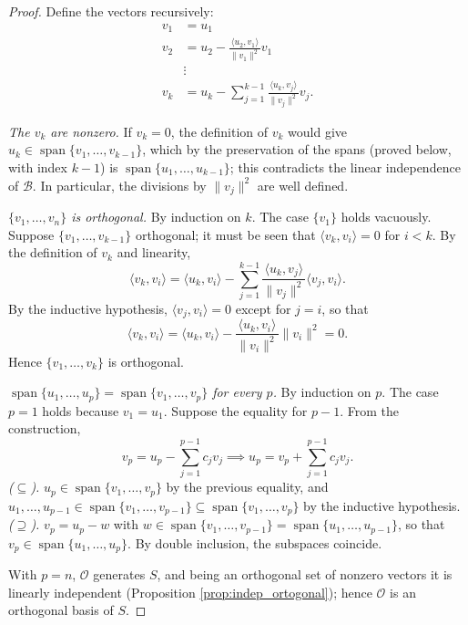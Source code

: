 \documentclass[11pt, a4paper]{article}
\begin{document}
\begin{proof}
Define the vectors recursively:
\begin{align*}
v_1 &= u_1 \\
v_2 &= u_2 - \frac{\langle u_2, v_1 \rangle}{\|v_1\|^2} v_1 \\
&\vdots \\
v_k &= u_k - \sum_{j=1}^{k-1} \frac{\langle u_k, v_j \rangle}{\|v_j\|^2} v_j.
\end{align*}

\textit{The $v_k$ are nonzero.} If $v_k = 0$, the definition of $v_k$ would give
$u_k \in \operatorname{span}\{v_1, \dots, v_{k-1}\}$, which by the preservation of the spans
(proved below, with index $k-1$) is $\operatorname{span}\{u_1, \dots, u_{k-1}\}$; this
contradicts the linear independence of $\mathcal{B}$. In particular, the divisions by
$\|v_j\|^2$ are well defined.

\textit{$\{v_1, \dots, v_n\}$ is orthogonal.} By induction on $k$. The case $\{v_1\}$ holds vacuously. Suppose $\{v_1, \dots, v_{k-1}\}$ orthogonal; it must be seen that $\langle v_k, v_i \rangle = 0$ for $i < k$. By the definition of $v_k$ and linearity,
\[
\langle v_k, v_i \rangle = \langle u_k, v_i \rangle - \sum_{j=1}^{k-1} \frac{\langle u_k, v_j \rangle}{\|v_j\|^2} \langle v_j, v_i \rangle.
\]
By the inductive hypothesis, $\langle v_j, v_i \rangle = 0$ except for $j = i$, so that
\[
\langle v_k, v_i \rangle = \langle u_k, v_i \rangle - \frac{\langle u_k, v_i \rangle}{\|v_i\|^2} \|v_i\|^2 = 0.
\]
Hence $\{v_1, \dots, v_k\}$ is orthogonal.

\textit{$\operatorname{span}\{u_1, \dots, u_p\} = \operatorname{span}\{v_1, \dots, v_p\}$ for every $p$.} By induction on $p$. The case $p = 1$ holds because $v_1 = u_1$. Suppose the equality for $p-1$. From the construction,
\[
v_p = u_p - \sum_{j=1}^{p-1} c_j v_j \implies u_p = v_p + \sum_{j=1}^{p-1} c_j v_j.
\]
\textit{($\subseteq$).} $u_p \in \operatorname{span}\{v_1, \dots, v_p\}$ by the previous equality, and $u_1, \dots, u_{p-1} \in \operatorname{span}\{v_1, \dots, v_{p-1}\} \subseteq \operatorname{span}\{v_1, \dots, v_p\}$ by the inductive hypothesis. \textit{($\supseteq$).} $v_p = u_p - w$ with $w \in \operatorname{span}\{v_1, \dots, v_{p-1}\} = \operatorname{span}\{u_1, \dots, u_{p-1}\}$, so that $v_p \in \operatorname{span}\{u_1, \dots, u_p\}$. By double inclusion, the subspaces coincide.

With $p = n$, $\mathcal{O}$ generates $S$, and being an orthogonal set of nonzero vectors it is linearly independent (Proposition \ref{prop:indep_ortogonal}); hence $\mathcal{O}$ is an orthogonal basis of $S$.
\end{proof}
\end{document}
